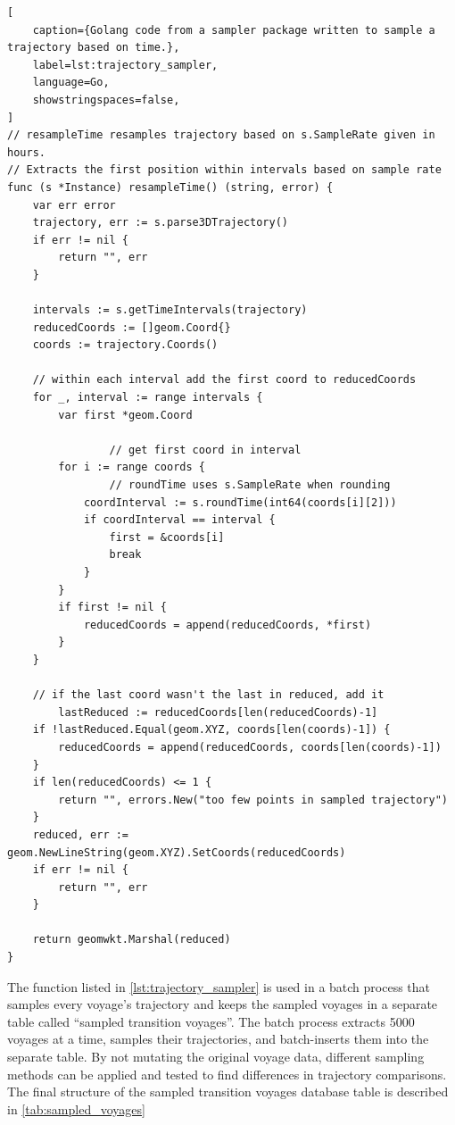 \begin{lstlisting}[
    caption={Golang code from a sampler package written to sample a trajectory based on time.},
    label=lst:trajectory_sampler,
    language=Go,
    showstringspaces=false,
]
// resampleTime resamples trajectory based on s.SampleRate given in hours.
// Extracts the first position within intervals based on sample rate
func (s *Instance) resampleTime() (string, error) {
	var err error
	trajectory, err := s.parse3DTrajectory()
	if err != nil {
		return "", err
	}

	intervals := s.getTimeIntervals(trajectory)
	reducedCoords := []geom.Coord{}
	coords := trajectory.Coords()

	// within each interval add the first coord to reducedCoords
	for _, interval := range intervals {
		var first *geom.Coord

                // get first coord in interval
		for i := range coords {
		        // roundTime uses s.SampleRate when rounding
			coordInterval := s.roundTime(int64(coords[i][2]))
			if coordInterval == interval {
				first = &coords[i]
				break
			}
		}
		if first != nil {
			reducedCoords = append(reducedCoords, *first)
		}
	}

	// if the last coord wasn't the last in reduced, add it
        lastReduced := reducedCoords[len(reducedCoords)-1]
	if !lastReduced.Equal(geom.XYZ, coords[len(coords)-1]) {
		reducedCoords = append(reducedCoords, coords[len(coords)-1])
	}
	if len(reducedCoords) <= 1 {
		return "", errors.New("too few points in sampled trajectory")
	}
	reduced, err := geom.NewLineString(geom.XYZ).SetCoords(reducedCoords)
	if err != nil {
		return "", err
	}

	return geomwkt.Marshal(reduced)
}
\end{lstlisting}

The function listed in \cref{lst:trajectory_sampler} is used in a batch process that samples every voyage's trajectory and keeps the sampled voyages in a separate table called ``sampled transition voyages''. The batch process extracts 5000 voyages at a time, samples their trajectories, and batch-inserts them into the separate table. By not mutating the original voyage data, different sampling methods can be applied and tested to find differences in trajectory comparisons. The final structure of the sampled transition voyages database table is described in \cref{tab:sampled_voyages}

